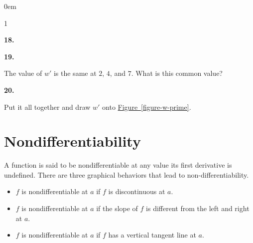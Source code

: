 \documentclass[12pt,]{book}
\theoremstyle{plain}
\theoremstyle{definition}
\numberwithin{equation}{section}
\newcounter{figstack}
\newcounter{figindex}
\newlength\fight
\newcommand\pushValignCaptionBottom[5][b]{%
\stepcounter{figstack}%
\expandafter\def\csname %
figalign\romannumeral\value{figstack}\endcsname{#1}%
\expandafter\def\csname %
figtype\romannumeral\value{figstack}\endcsname{#2}%
\expandafter\def\csname %
figwd\romannumeral\value{figstack}\endcsname{#3}%
\expandafter\def\csname %
figcontent\romannumeral\value{figstack}\endcsname{#4}%
\expandafter\def\csname %
figcap\romannumeral\value{figstack}\endcsname{#5}%
\setbox0=\hbox{%
\begin{#2}{#3}#4\end{#2}}%
\ifdim\dimexpr\ht0+\dp0\relax>\fight\global\setlength{\fight}{%
\dimexpr\ht0+\dp0\relax}\fi%
}
\newcommand\popValignCaptionBottom{%
\setcounter{figindex}{0}%
\hfill%
\whiledo{\value{figindex}<\value{figstack}}{%
\stepcounter{figindex}%
\def\tmp{\csname figwd\romannumeral\value{figindex}\endcsname}%
\begin{\csname figtype\romannumeral\value{figindex}\endcsname}[t]{\tmp}%
\centering%
\stackinset{c}{}%
{\csname figalign\romannumeral\value{figindex}\endcsname}{}%
{\csname figcontent\romannumeral\value{figindex}\endcsname}%
{\rule{0pt}{\fight}}\par%
\csname figcap\romannumeral\value{figindex}\endcsname%
\end{\csname figtype\romannumeral\value{figindex}\endcsname}%
\hfill%
}%
\setcounter{figstack}{0}%
\setlength{\fight}{0pt}%
\hfill%
}
\newenvironment{exercisegroup}%
{\medskip\noindent}%
{\par\bigskip}%
\newlength{\exercisegroupindent}%
\newlength{\exercisegroupitemwidth}%
\newenvironment{exercisegrouplist}%
{\vspace{-\partopsep}%
\begin{adjustwidth}{\exercisegroupindent}{0em}}%
{\end{adjustwidth}%
\vspace{-\partopsep}%
\vspace{\baselineskip}}%
\newenvironment{exercisegroupbycol}[1]%
{\begin{exercisegrouplist}%
\vspace{-\multicolsep}%
\begin{multicols}{#1}%
\setlength{\parindent}{0em}%
\setlength{\exercisegroupitemwidth}{\linewidth}}%
{\end{multicols}%
\vspace{-\multicolsep}%
\end{exercisegrouplist}}%
\newenvironment{exercisegroupitem}[1]%
{\begin{minipage}[t]{\exercisegroupitemwidth}
\vspace{0pt}%
{\bfseries#1}%
\rule{0pt}{\baselineskip}}{\strut%
\end{minipage}%
\hspace{\columnsep}}%
\providecommand\phantomsection{}
\newcommand{\fe}[2]{\mathop{{#1}{\left(#2\right)}}}
\newcommand{\fd}[1]{#1'}
\begin{document}
\begin{exercisegroup}
\begin{exercisegroupbycol}{1}
\begin{exercisegroupitem}{18. }
\end{exercisegroupitem}%
\par%
\begin{exercisegroupitem}{19. }\phantomsection\hypertarget{exercise-171}{\null}
The value of \(\fd{w}\) is the same at \(2\), \(4\), and \(7\). What is this common value?%
\end{exercisegroupitem}%
\par%
\begin{exercisegroupitem}{20. }\phantomsection\hypertarget{exercise-172}{\null}
Put it all together and draw \(\fd{w}\) onto \hyperref[figure-w-prime]{Figure~\ref*{figure-w-prime}}.%
\end{exercisegroupitem}%
\par%
\end{exercisegroupbycol}%
\end{exercisegroup}%
\typeout{************************************************}
\typeout{************************************************}
\section[Nondifferentiability]{Nondifferentiability}\label{section-nondifferentiability}
A function is said to be nondifferentiable at any value its first derivative is undefined.  There are three graphical behaviors that lead to non-differentiability.%
\begin{itemize}[label=\textbullet]
\item{}\(f\) is nondifferentiable at \(a\) if \(f\) is discontinuous at \(a\).\item{}\(f\) is nondifferentiable at \(a\) if the slope of \(f\) is different from the left and right at \(a\).\item{}\(f\) is nondifferentiable at \(a\) if \(f\) has a vertical tangent line at \(a\).\end{itemize}
\typeout{************************************************}
\typeout{************************************************}
\end{document}
